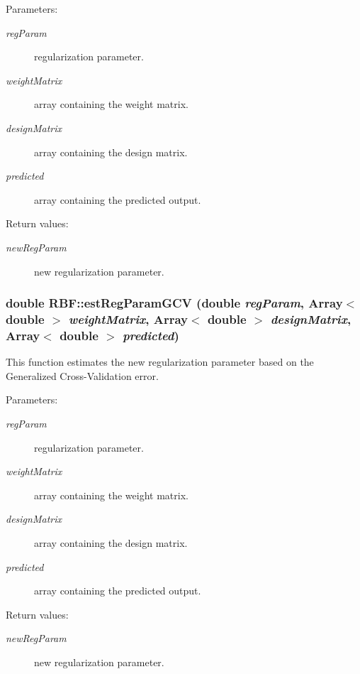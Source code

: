 \begin{Desc}
\item[Parameters:]
\begin{description}
\item[{\em reg\-Param}]regularization parameter. \item[{\em weight\-Matrix}]array containing the weight matrix. \item[{\em design\-Matrix}]array containing the design matrix. \item[{\em predicted}]array containing the predicted output. \end{description}
\end{Desc}
\begin{Desc}
\item[Return values:]
\begin{description}
\item[{\em new\-Reg\-Param}]new regularization parameter.\end{description}
\end{Desc}
\subsubsection{\setlength{\rightskip}{0pt plus 5cm}double RBF::est\-Reg\-Param\-GCV (double {\em reg\-Param}, Array$<$ double $>$ {\em weight\-Matrix}, Array$<$ double $>$ {\em design\-Matrix}, Array$<$ double $>$ {\em predicted})\hspace{0.3cm}{\tt  [static]}}\label{classRBF_e12}


This function estimates the new regularization parameter based on the Generalized Cross-Validation error. 

\begin{Desc}
\item[Parameters:]
\begin{description}
\item[{\em reg\-Param}]regularization parameter. \item[{\em weight\-Matrix}]array containing the weight matrix. \item[{\em design\-Matrix}]array containing the design matrix. \item[{\em predicted}]array containing the predicted output. \end{description}
\end{Desc}
\begin{Desc}
\item[Return values:]
\begin{description}
\item[{\em new\-Reg\-Param}]new regularization parameter.\end{description}
\end{Desc}
